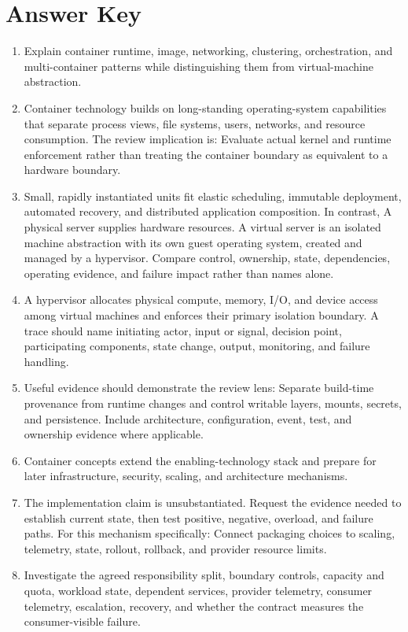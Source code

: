 \documentclass[11pt]{article}
\begin{document}
\section{Answer Key}
\begin{enumerate}
\item Explain container runtime, image, networking, clustering, orchestration, and multi-container patterns while distinguishing them from virtual-machine abstraction.
\item Container technology builds on long-standing operating-system capabilities that separate process views, file systems, users, networks, and resource consumption. The review implication is: Evaluate actual kernel and runtime enforcement rather than treating the container boundary as equivalent to a hardware boundary.
\item Small, rapidly instantiated units fit elastic scheduling, immutable deployment, automated recovery, and distributed application composition. In contrast, A physical server supplies hardware resources. A virtual server is an isolated machine abstraction with its own guest operating system, created and managed by a hypervisor. Compare control, ownership, state, dependencies, operating evidence, and failure impact rather than names alone.
\item A hypervisor allocates physical compute, memory, I/O, and device access among virtual machines and enforces their primary isolation boundary. A trace should name initiating actor, input or signal, decision point, participating components, state change, output, monitoring, and failure handling.
\item Useful evidence should demonstrate the review lens: Separate build-time provenance from runtime changes and control writable layers, mounts, secrets, and persistence. Include architecture, configuration, event, test, and ownership evidence where applicable.
\item Container concepts extend the enabling-technology stack and prepare for later infrastructure, security, scaling, and architecture mechanisms.
\item The implementation claim is unsubstantiated. Request the evidence needed to establish current state, then test positive, negative, overload, and failure paths. For this mechanism specifically: Connect packaging choices to scaling, telemetry, state, rollout, rollback, and provider resource limits.
\item Investigate the agreed responsibility split, boundary controls, capacity and quota, workload state, dependent services, provider telemetry, consumer telemetry, escalation, recovery, and whether the contract measures the consumer-visible failure.

\end{enumerate}
\end{document}
